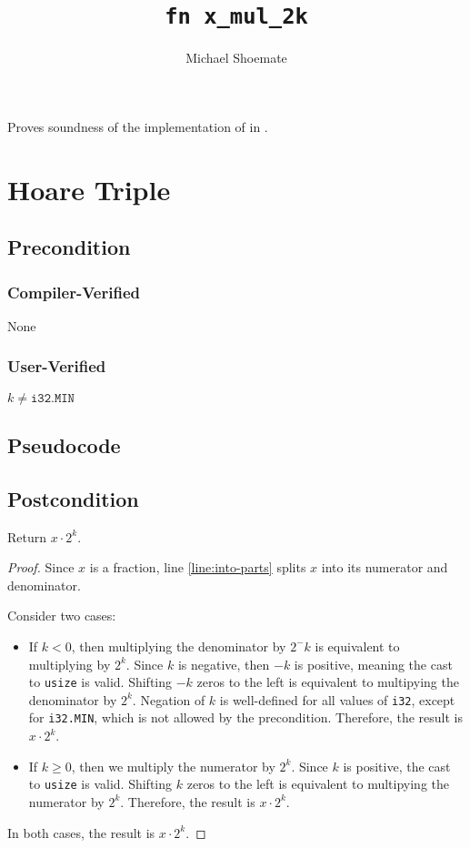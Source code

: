 \documentclass{article}
\title{\texttt{fn x\_mul\_2k}}
\author{Michael Shoemate}
\date{}
\begin{document}
\maketitle

\contrib
Proves soundness of the implementation of  in .

\section{Hoare Triple}
\subsection*{Precondition}
\subsubsection*{Compiler-Verified}
None

\subsubsection*{User-Verified}
$k \neq \texttt{i32.MIN}$


\subsection*{Pseudocode}


\subsection*{Postcondition}
\begin{theorem}
    Return $x \cdot 2^k$.
\end{theorem}

\begin{proof}
    Since $x$ is a fraction, line \ref{line:into-parts} splits $x$ into its numerator and denominator.

    Consider two cases:
    \begin{itemize}
        \item If $k < 0$, then multiplying the denominator by $2^-k$ is equivalent to multiplying by $2^k$.
            Since $k$ is negative, then $-k$ is positive, meaning the cast to \texttt{usize} is valid.
            Shifting $-k$ zeros to the left is equivalent to multipying the denominator by $2^k$.
            Negation of $k$ is well-defined for all values of \texttt{i32}, 
            except for \texttt{i32.MIN}, which is not allowed by the precondition.
            Therefore, the result is $x \cdot 2^k$.

        \item If $k \geq 0$, then we multiply the numerator by $2^k$.
            Since $k$ is positive, the cast to \texttt{usize} is valid.
            Shifting $k$ zeros to the left is equivalent to multipying the numerator by $2^k$.
            Therefore, the result is $x \cdot 2^k$.
    \end{itemize}

    In both cases, the result is $x \cdot 2^k$.
\end{proof}
\end{document}
